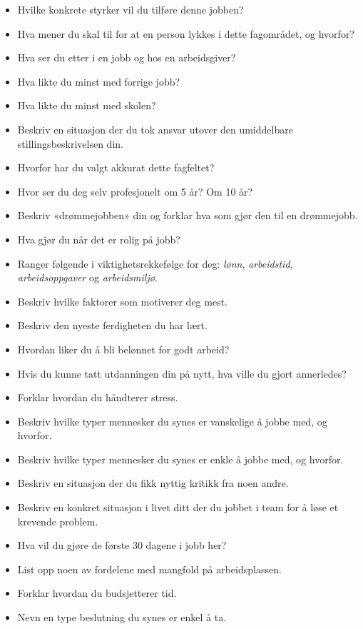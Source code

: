 \begin{itemize}
\item{} Hvilke konkrete styrker vil du tilføre denne jobben?
\item{} Hva mener du skal til for at en person lykkes i dette fagområdet, og hvorfor?
\item{} Hva ser du etter i en jobb og hos en arbeidsgiver?
\item{} Hva likte du minst med forrige jobb?
\item{} Hva likte du minst med skolen?
\item{} Beskriv en situasjon der du tok ansvar utover den umiddelbare stillingsbeskrivelsen din.
\item{} Hvorfor har du valgt akkurat dette fagfeltet?
\item{} Hvor ser du deg selv profesjonelt om 5 år? Om 10 år?
\item{} Beskriv «drømmejobben» din og forklar hva som gjør den til en drømmejobb.
\item{} Hva gjør du når det er rolig på jobb?
\item{} Ranger følgende i viktighetsrekkefølge for deg: {\it lønn}, {\it arbeidstid}, {\it arbeidsoppgaver} og {\it arbeidsmiljø}.
\item{} Beskriv hvilke faktorer som motiverer deg mest.
\item{} Beskriv den nyeste ferdigheten du har lært.
\item{} Hvordan liker du å bli belønnet for godt arbeid?
\item{} Hvis du kunne tatt utdanningen din på nytt, hva ville du gjort annerledes?
\item{} Forklar hvordan du håndterer stress.
\item{} Beskriv hvilke typer mennesker du synes er vanskelige å jobbe med, og hvorfor.
\item{} Beskriv hvilke typer mennesker du synes er enkle å jobbe med, og hvorfor.
\item{} Beskriv en situasjon der du fikk nyttig kritikk fra noen andre.
\item{} Beskriv en konkret situasjon i livet ditt der du jobbet i team for å løse et krevende problem.
\item{} Hva vil du gjøre de første 30 dagene i jobb her?
\item{} List opp noen av fordelene med mangfold på arbeidsplassen.
\item{} Forklar hvordan du budsjetterer tid.
\item{} Nevn en type beslutning du synes er enkel å ta.

\end{itemize}
